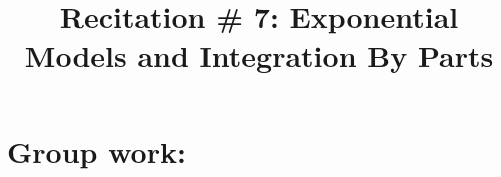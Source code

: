 \documentclass[noinstructornotes]{ximera}
\title{Recitation \# 7: Exponential Models and Integration By Parts}
\begin{document}
\begin{abstract}		\end{abstract}
\maketitle



\begin{comment}
\section{Warm up:}

	\begin{freeResponse}
	
	\end{freeResponse}
	
\begin{instructorNotes}

\end{instructorNotes}
\end{comment}







\section{Group work:}
\end{document}
